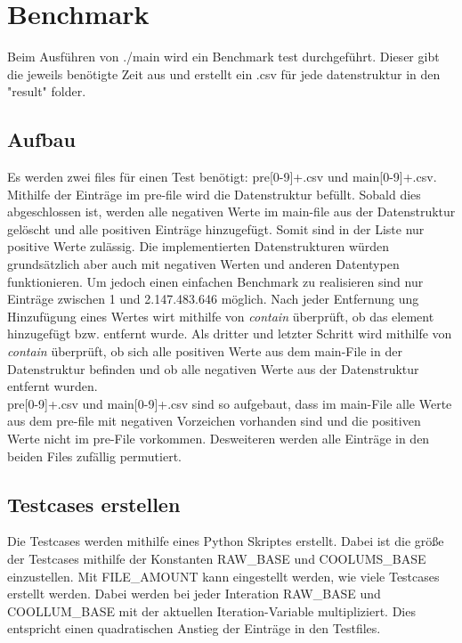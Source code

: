 \section{Benchmark}
Beim Ausführen von ./main wird ein Benchmark test durchgeführt. Dieser gibt die jeweils benötigte Zeit aus und erstellt ein .csv für jede datenstruktur
in den "result" folder. 

\subsection{Aufbau}
\label{bench:aufbau}
Es werden zwei files für einen Test benötigt: pre[0-9]+.csv und main[0-9]+.csv. Mithilfe der Einträge im pre-file wird die
Datenstruktur befüllt. Sobald dies abgeschlossen ist, werden alle negativen Werte im main-file aus der Datenstruktur gelöscht 
und alle positiven Einträge hinzugefügt. Somit sind in der Liste nur positive Werte zulässig. Die implementierten Datenstrukturen
würden grundsätzlich aber auch mit negativen Werten und anderen Datentypen funktionieren. Um jedoch einen einfachen 
Benchmark zu realisieren sind nur Einträge zwischen 1 und 2.147.483.646 möglich. 
Nach jeder Entfernung ung Hinzufügung eines Wertes wirt mithilfe von \textit{contain} überprüft, ob das element hinzugefügt bzw.
entfernt wurde. 
Als dritter und letzter Schritt wird mithilfe von \textit{contain} überprüft, ob sich alle positiven Werte aus dem main-File 
in der Datenstruktur befinden und ob alle negativen Werte aus der Datenstruktur entfernt wurden. 
\\
pre[0-9]+.csv und main[0-9]+.csv sind so aufgebaut, dass im main-File alle Werte aus dem pre-file mit negativen Vorzeichen
vorhanden sind und die positiven Werte nicht im pre-File vorkommen. Desweiteren werden alle Einträge in den beiden Files
zufällig permutiert. 

\subsection{Testcases erstellen}
Die Testcases werden mithilfe eines Python Skriptes erstellt. Dabei ist die größe der Testcases mithilfe der Konstanten
RAW\_BASE und COOLUMS\_BASE einzustellen. Mit FILE\_AMOUNT kann eingestellt werden, wie viele Testcases erstellt werden.
Dabei werden bei jeder Interation RAW\_BASE und COOLLUM\_BASE mit der aktuellen Iteration-Variable multipliziert.
Dies entspricht einen quadratischen Anstieg der Einträge in den Testfiles.   


